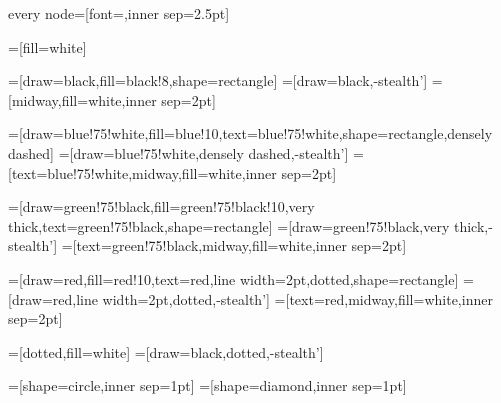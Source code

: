\usepackage{tikz}
\usetikzlibrary{arrows,automata,positioning,er}

\tikzstyle every node=[font=\footnotesize\sffamily,inner sep=2.5pt]

\newcommand{\red}{red}
\newcommand{\redfill}{\red!10}
\newcommand{\green}{green!75!black}
\newcommand{\greenfill}{\green!10}
\newcommand{\blue}{blue!75!white}
\newcommand{\bluefill}{blue!10}
\newcommand{\grey}{black!8}
=[fill=white]

=[draw=black,fill=\grey,shape=rectangle]
=[draw=black,-stealth']
=[midway,fill=white,inner sep=2pt]

=[draw=\blue,fill=\bluefill,text=\blue,shape=rectangle,densely dashed]
=[draw=\blue,densely dashed,-stealth']
=[text=\blue,midway,fill=white,inner sep=2pt]

=[draw=\green,fill=\greenfill,very thick,text=\green,shape=rectangle]
=[draw=\green,very thick,-stealth']
=[text=\green,midway,fill=white,inner sep=2pt]

=[draw=\red,fill=\redfill,text=\red,line width=2pt,dotted,shape=rectangle]
=[draw=\red,line width=2pt,dotted,-stealth']
=[text=\red,midway,fill=white,inner sep=2pt]

=[dotted,fill=white]
=[draw=black,dotted,-stealth']

=[shape=circle,inner sep=1pt]
=[shape=diamond,inner sep=1pt]

\newcommand{\ml}[1]{
\begin{tabular}{@{}l@{}}#1\vspace{-2pt}\end{tabular}
}

